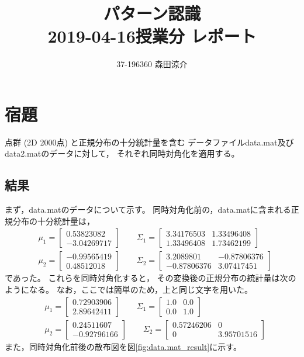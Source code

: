 \documentclass[dvipdfmx, fleqn]{jsarticle}
\title{
	パターン認識 \\
	2019-04-16授業分 レポート
	}
\author{37-196360 \quad 森田涼介}
\begin{document}
\maketitle

\section*{宿題}


点群 (2D 2000点) と正規分布の十分統計量を含む
データファイルdata.mat及びdata2.matのデータに対して，
それぞれ同時対角化を適用する。


\subsection*{結果}

まず，data.matのデータについて示す。
同時対角化前の，data.matに含まれる正規分布の十分統計量は，
\begin{align}
	& \mu_1 =
		\begin{bmatrix}
			0.53823082 \\ -3.04269717
		\end{bmatrix}
	\qquad \Sigma_1 =
		\begin{bmatrix}
			 3.34176503 & 1.33496408 \\
			 1.33496408 & 1.73462199
		\end{bmatrix} \\
	& \mu_2 =
		\begin{bmatrix}
			-0.99565419 \\ 0.48512018
		\end{bmatrix}
	\qquad \Sigma_2 =
		\begin{bmatrix}
 			3.2089801 &  -0.87806376 \\
 			-0.87806376 & 3.07417451
		\end{bmatrix}
\end{align}
であった。
これらを同時対角化すると，
その変換後の正規分布の統計量は次のようになる。
なお，ここでは簡単のため，上と同じ文字を用いた。
\begin{align}
	& \mu_1 =
		\begin{bmatrix}
			0.72903906 \\ 2.89642411
		\end{bmatrix}
	\qquad \Sigma_1 =
		\begin{bmatrix}
			1.0 & 0.0 \\
			0.0 & 1.0
		\end{bmatrix} \\
	& \mu_2 =
		\begin{bmatrix}
			0.24511607 \\ -0.92796166
		\end{bmatrix}
	\qquad \Sigma_2 =
		\begin{bmatrix}
			0.57246206 & 0 \\
			0 & 3.95701516
		\end{bmatrix}
\end{align}
また，同時対角化前後の散布図を図\ref{fig:data.mat_result}に示す。
\end{document}
